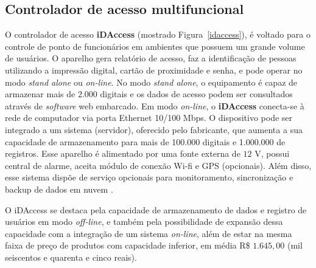  \subsection{Controlador de acesso multifuncional}

 O controlador de acesso \textbf{iDAccess} (mostrado Figura~\ref{idaccess}), é voltado para o controle de ponto de funcionários em ambientes que possuem um grande volume de usuários. O aparelho gera relatório de acesso, faz a identificação de pessoas utilizando a impressão digital, cartão de proximidade e senha, e pode operar no modo \textit{stand alone} ou \textit{on-line}. No modo \textit{stand alone}, o equipamento é capaz de armazenar mais de 2.000 digitais e os dados de acesso podem ser consultados através de \textit{software} web embarcado. Em modo \textit{on-line}, o \textbf{iDAccess} conecta-se à rede de computador via porta Ethernet 10/100 Mbps. O dispositivo pode ser integrado a um sistema (servidor), oferecido pelo fabricante, que aumenta a sua capacidade de armazenamento para mais de 100.000 digitais e 1.000.000 de registros. Esse aparelho é alimentado por uma fonte externa de $12$ V, possui central de alarme, aceita módulo de conexão Wi-fi e GPS (opcionais). Além disso, esse sistema dispõe de serviço opcionais para monitoramento, sincronização e backup de dados em nuvem \cite{idaccess}. 

 O iDAccess se destaca pela capacidade de armazenamento de dados e registro de usuários em modo \textit{off-line}, e também pela possibilidade de expansão dessa capacidade com a integração de um sistema \textit{on-line}, além de estar na mesma faixa de preço de produtos com capacidade inferior, em média R{\$} $1.645,00$ (mil seiscentos e quarenta e cinco reais).

